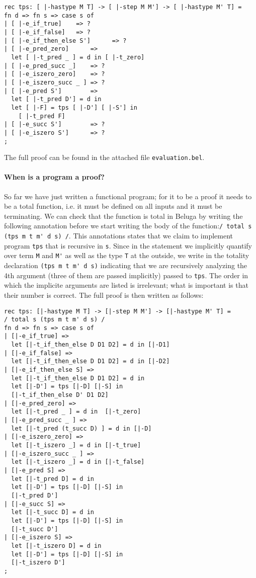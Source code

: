 \begin{lstlisting}
rec tps: [ |-hastype M T] -> [ |-step M M'] -> [ |-hastype M' T] = 
fn d => fn s => case s of
| [ |-e_if_true]    => ? 
| [ |-e_if_false]   => ?
| [ |-e_if_then_else S']      => ?
| [ |-e_pred_zero]      => 
  let [ |-t_pred _ ] = d in [ |-t_zero]
| [ |-e_pred_succ _]    => ?
| [ |-e_iszero_zero]    => ?
| [ |-e_iszero_succ _ ] => ?
| [ |-e_pred S']        => 
  let [ |-t_pred D'] = d in 
  let [ |-F] = tps [ |-D'] [ |-S'] in 
    [ |-t_pred F]
| [ |-e_succ S']        => ?
| [ |-e_iszero S']      => ?
;
\end{lstlisting}

The full proof can be found in the attached file \lstinline!evaluation.bel!.


\paragraph{When is a program a proof?} So far we have just written a
functional program; for it to be a proof it needs to be a total
function, i.e. it must be defined on all inputs and it must be
terminating. We can check that the function is total in Beluga by
writing the following annotation before we start writing the body of
the function:\lstinline!/ total s (tps m t m' d s) /!. This
annotations states that we claim to implement program \lstinline!tps! that is
recursive in \lstinline!s!. Since in the statement we implicitly
quantify over term \lstinline!M! and \lstinline!M'! as well as the
type \lstinline!T! at the outside, we write in the totality
declaration \lstinline!(tps m t m' d s)! indicating that we are
recursively analyzing the 4th argument (three of them are passed
implicitly) passed to \lstinline!tps!. The order in which the
implicite arguments are listed is irrelevant; what is important is
that their number is correct.
The full proof is then written as follows:


\begin{lstlisting}
rec tps: [|-hastype M T] -> [|-step M M'] -> [|-hastype M' T] = 
/ total s (tps m t m' d s) /
fn d => fn s => case s of
| [|-e_if_true] => 
  let [|-t_if_then_else D D1 D2] = d in [|-D1]
| [|-e_if_false] => 
  let [|-t_if_then_else D D1 D2] = d in [|-D2]
| [|-e_if_then_else S] => 
  let [|-t_if_then_else D D1 D2] = d in 
  let [|-D'] = tps [|-D] [|-S] in
  [|-t_if_then_else D' D1 D2]
| [|-e_pred_zero] => 
  let [|-t_pred _ ] = d in  [|-t_zero]
| [|-e_pred_succ _ ] => 
  let [|-t_pred (t_succ D) ] = d in [|-D]
| [|-e_iszero_zero] => 
  let [|-t_iszero _] = d in [|-t_true]
| [|-e_iszero_succ _ ] => 
  let [|-t_iszero _] = d in [|-t_false]
| [|-e_pred S] => 
  let [|-t_pred D] = d in 
  let [|-D'] = tps [|-D] [|-S] in 
  [|-t_pred D']
| [|-e_succ S] => 
  let [|-t_succ D] = d in 
  let [|-D'] = tps [|-D] [|-S] in 
  [|-t_succ D']
| [|-e_iszero S] => 
  let [|-t_iszero D] = d in 
  let [|-D'] = tps [|-D] [|-S] in 
  [|-t_iszero D']
;
\end{lstlisting}



